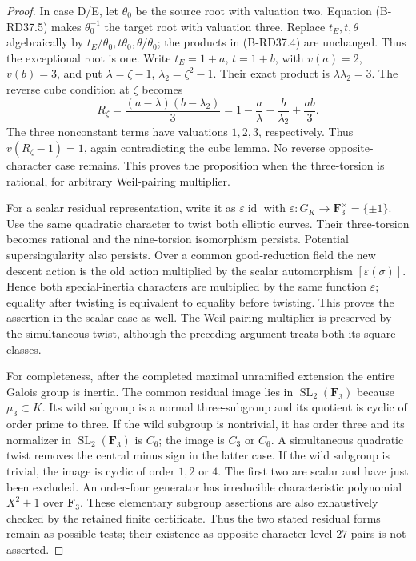 \begin{proof}
In case D/E, let $\theta_0$ be the source root with valuation two.
Equation (B-RD37.5) makes $\theta_0^{-1}$ the target root with
valuation three. Replace $t_E,t,\theta$ algebraically by
$t_E/\theta_0,t\theta_0,\theta/\theta_0$; the products in
(B-RD37.4) are unchanged. Thus the exceptional root is one.
Write $t_E=1+a$, $t=1+b$, with $v(a)=2$, $v(b)=3$, and put
$\lambda=\zeta-1$, $\lambda_2=\zeta^2-1$. Their exact product
is $\lambda\lambda_2=3$. The reverse cube condition at $\zeta$
becomes
\[
 R_\zeta=\frac{(a-\lambda)(b-\lambda_2)}3
      =1-\frac a\lambda-\frac b{\lambda_2}+\frac{ab}3.
                                                        \tag{B-RD37.7}
\]
The three nonconstant terms have valuations $1,2,3$, respectively.
Thus $v(R_\zeta-1)=1$, again contradicting the cube lemma.
No reverse opposite-character case remains. This proves the
proposition when the three-torsion is rational, for arbitrary
Weil-pairing multiplier.

For a scalar residual representation, write it as
$\varepsilon\operatorname{id}$ with
$\varepsilon:G_K\to\mathbf F_3^\times=\{\pm1\}$.
Use the same quadratic character to twist both elliptic curves.
Their three-torsion becomes rational and the nine-torsion
isomorphism persists. Potential supersingularity also persists.
Over a common good-reduction field the new descent action is the
old action multiplied by the scalar automorphism
$[\varepsilon(\sigma)]$. Hence both special-inertia characters
are multiplied by the same function $\varepsilon$; equality after
twisting is equivalent to equality before twisting. This proves
the assertion in the scalar case as well. The Weil-pairing
multiplier is preserved by the simultaneous twist, although the
preceding argument treats both its square classes.

For completeness, after the completed maximal unramified extension
the entire Galois group is inertia. The common residual image lies
in $\operatorname{SL}_2(\mathbf F_3)$ because $\mu_3\subset K$.
Its wild subgroup is a normal three-subgroup and its quotient is
cyclic of order prime to three. If the wild subgroup is nontrivial,
it has order three and its normalizer in
$\operatorname{SL}_2(\mathbf F_3)$ is $C_6$; the image is $C_3$
or $C_6$. A simultaneous quadratic twist removes the central
minus sign in the latter case. If the wild subgroup is trivial,
the image is cyclic of order $1,2$ or $4$. The first two are
scalar and have just been excluded. An order-four generator has
irreducible characteristic polynomial $X^2+1$ over $\mathbf F_3$.
These elementary subgroup assertions are also exhaustively checked
by the retained finite certificate. Thus the two stated
residual forms remain as possible tests; their existence as
opposite-character level-$27$ pairs is not asserted.
\end{proof}

